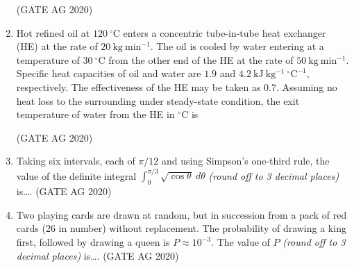 \documentclass[journal]{IEEEtran}
\begin{document}
\begin{enumerate}


\begin{enumerate}
\end{enumerate}
\hfill(GATE AG 2020)\\

\medskip

\item
Hot refined oil at $120~^\circ\mathrm{C}$ enters a concentric tube-in-tube heat exchanger (HE) at the rate of $20~\mathrm{kg~min^{-1}}$. The oil is cooled by water entering at a temperature of $30~^\circ\mathrm{C}$ from the other end of the HE at the rate of $50~\mathrm{kg~min^{-1}}$. Specific heat capacities of oil and water are $1.9$ and $4.2~\mathrm{kJ~kg^{-1}~^\circ C^{-1}}$, respectively. The effectiveness of the HE may be taken as $0.7$. Assuming no heat loss to the surrounding under steady-state condition, the exit temperature of water from the HE in $^\circ$C is
\begin{enumerate}
\end{enumerate}
\hfill(GATE AG 2020)\\

\medskip

\item 
Taking six intervals, each of $\pi/12$ and using Simpson's one-third rule, the value of the definite integral $\int_{0}^{\pi/3} \sqrt{\cos \theta} ~d\theta$ \emph{(round off to 3 decimal places)} is\dots.
\hfill(GATE AG 2020)\\

\medskip

\item 
Two playing cards are drawn at random, but in succession from a pack of red cards (26 in number) without replacement. The probability of drawing a king first, followed by drawing a queen is $P \approx 10^{-3}$. The value of $P$ \emph{(round off to 3 decimal places)} is\dots.
\hfill(GATE AG 2020)\\


\end{enumerate}
\end{document}

